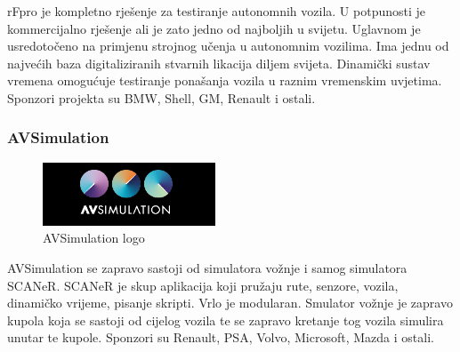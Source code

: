 rFpro je kompletno rješenje za testiranje autonomnih vozila. U potpunosti je kommercijalno rješenje ali je zato jedno od najboljih u svijetu. Uglavnom je usredotočeno na primjenu strojnog učenja u autonomnim vozilima. Ima jednu od najvećih baza digitaliziranih stvarnih likacija diljem svijeta. Dinamički sustav vremena omogućuje testiranje ponašanja vozila u raznim vremenskim uvjetima. Sponzori projekta su BMW, Shell, GM, Renault i ostali.

\subsubsection{AVSimulation}
\begin{figure}[ht!]
  \centering
  \includegraphics{images/avsimulation_logo.png}
  \caption{AVSimulation logo}
\end{figure}

AVSimulation se zapravo sastoji od simulatora vožnje i samog simulatora SCANeR. SCANeR je skup aplikacija koji pružaju rute, senzore, vozila, dinamičko vrijeme, pisanje skripti. Vrlo je modularan. Smulator vožnje je zapravo kupola koja se sastoji od cijelog vozila te se zapravo kretanje tog vozila simulira unutar te kupole. Sponzori su Renault, PSA, Volvo, Microsoft, Mazda i ostali.